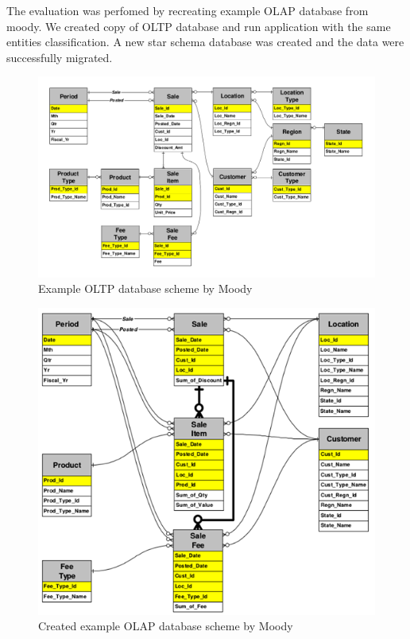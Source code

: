 The evaluation was perfomed by recreating example OLAP database from moody.
We created copy of OLTP database and run application with the same entities classification.
A new star schema database was created and the data were successfully migrated.
\begin{figure}[tb]
  \centering
  \includegraphics[width=\linewidth]{images/exampleDatabase}
  \caption{Example OLTP database scheme by Moody \andothers \cite{moody2000enterprise}}
  \label{fig:exampleDatabase}
\end{figure}

\begin{figure}[tb]
  \centering
  \includegraphics[width=\linewidth]{images/exampleDatabaseStarModel}
  \caption{Created example OLAP database scheme by Moody \andothers \cite{moody2000enterprise}}
  \label{fig:exampleDatabaseStarModel}
\end{figure}
